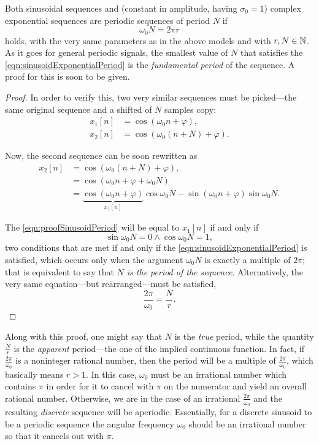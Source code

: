 \documentclass[\documentfontsize, twocolumn]{\classname}
\begin{document}
Both sinusoidal se\-quen\-ces and (constant in amplitude, having $\sigma_0 = 1$) complex exponential se\-quen\-ces are periodic se\-quen\-ces of period $N$ if
\begin{equation}\label{eqn:sinusoidExponentialPeriod}
\omega_0 N = 2\pi r
\end{equation}
holds, with the very same parameters as in the above models and with $r,N \in \mathbb N$. As it goes for general periodic signals, the smallest value of $N$ that satisfies the \ref{eqn:sinusoidExponentialPeriod} is the \emph{fundamental period} of the se\-quen\-ce. A proof for this is soon to be given.
\begin{proof}
In order to verify this, two very similar se\-quen\-ces must be picked---the same original se\-quen\-ce and a shifted of $N$ samples copy:
\begin{align}
    x_1[n] &= \cos{(\omega_0 n + \varphi)},\\
    x_2[n] &= \cos{(\omega_0 (n + N) + \varphi)}.
\end{align}

Now, the second se\-quen\-ce can be soon rewritten as
\begin{align}
    x_2[n] &= \cos{(\omega_0 (n + N) + \varphi)},\\
           &= \cos{(\omega_0 n + \varphi + \omega_0 N)}\\
           &= \underbrace{\cos{(\omega_0 n + \varphi)}}_{x_1[n]}\cos{\omega_0 N} - \sin{(\omega_0 n + \varphi)}\sin{\omega_0 N}.\label{eqn:proofSinusoidPeriod}
\end{align}

    The \ref{eqn:proofSinusoidPeriod} will be equal to $x_1[n]$ if and only if \begin{equation}\sin{\omega_0 N} = 0 \wedge \cos{\omega_0 N} = 1,\end{equation} two conditions that are met if and only if the \ref{eqn:sinusoidExponentialPeriod} is satisfied, which occurs only when the argument $\omega_0 N$ is exactly a multiple of $2\pi$; that is equivalent to say that \emph{$N$ is the period of the sequence}. Alternatively, the very same equation---but re\-\"ar\-ran\-ged---must be satisfied,
\begin{equation}\label{eqn:sinusoidExponentialPeriodFraction}
    \frac{2\pi}{\omega_0} = \frac{N}{r}.
\end{equation}
\end{proof}

Along with this proof, one might say that $N$ is the \emph{true} period, while the quantity $\frac{N}{r}$ is the \emph{apparent} period---the one of the implied continuous function.
In fact, if $\frac{2\pi}{\omega_0}$ is a noninteger rational number, then the period will be a multiple of $\frac{2\pi}{\omega_0}$, which basically means $r > 1$.
In this case, $\omega_0$ must be an irrational number which contains $\pi$ in order for it to cancel with $\pi$ on the numerator and yield an overall rational number.
Otherwise, we are in the case of an irrational $\frac{2\pi}{\omega_0}$ and the resulting \emph{discrete} se\-quen\-ce will be aperiodic.
Essentially, for a discrete sinusoid to be a periodic sequence the angular frequency $\omega_0$ should be an irrational number so that it cancels out with $\pi$.
\end{document}
